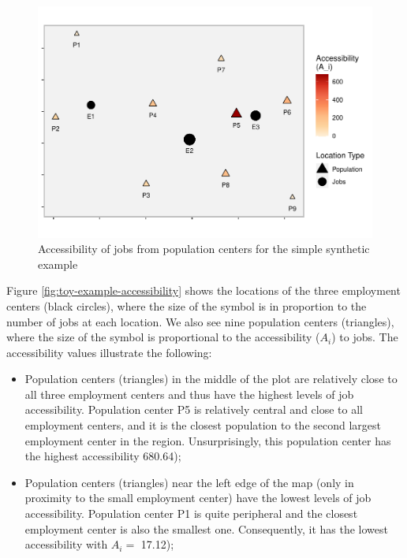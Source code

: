 \documentclass[]{elsarticle} %
\begin{document}
\begin{figure}
\includegraphics[width=1\linewidth]{Spatial-Availability_files/figure-latex/toy-example-accessibility-plot-1} \caption{\label{fig:toy-example-accessibility}Accessibility of jobs from population centers for the simple synthetic example}\label{fig:toy-example-accessibility-plot}
\end{figure}

Figure \ref{fig:toy-example-accessibility} shows the locations of the
three employment centers (black circles), where the size of the symbol
is in proportion to the number of jobs at each location. We also see
nine population centers (triangles), where the size of the symbol is
proportional to the accessibility (\(A_i\)) to jobs. The accessibility
values illustrate the following:

\begin{itemize}
\item
  Population centers (triangles) in the middle of the plot are
  relatively close to all three employment centers and thus have the
  highest levels of job accessibility. Population center P5 is
  relatively central and close to all employment centers, and it is the
  closest population to the second largest employment center in the
  region. Unsurprisingly, this population center has the highest
  accessibility 680.64);
\item
  Population centers (triangles) near the left edge of the map (only in
  proximity to the small employment center) have the lowest levels of
  job accessibility. Population center P1 is quite peripheral and the
  closest employment center is also the smallest one. Consequently, it
  has the lowest accessibility with \(A_i=\) 17.12);
\end{itemize}
\end{document}
